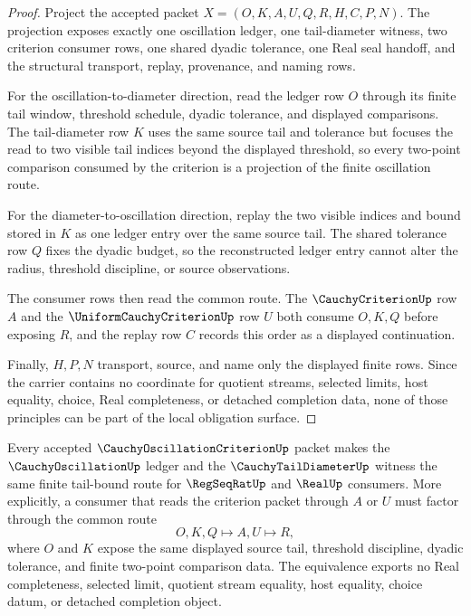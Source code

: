 \begin{proof}
Project the accepted packet $X=(O,K,A,U,Q,R,H,C,P,N)$. The projection exposes exactly one oscillation ledger, one tail-diameter witness, two criterion consumer rows, one shared dyadic tolerance, one Real seal handoff, and the structural transport, replay, provenance, and naming rows.

For the oscillation-to-diameter direction, read the ledger row $O$ through its finite tail window, threshold schedule, dyadic tolerance, and displayed comparisons. The tail-diameter row $K$ uses the same source tail and tolerance but focuses the read to two visible tail indices beyond the displayed threshold, so every two-point comparison consumed by the criterion is a projection of the finite oscillation route.

For the diameter-to-oscillation direction, replay the two visible indices and bound stored in $K$ as one ledger entry over the same source tail. The shared tolerance row $Q$ fixes the dyadic budget, so the reconstructed ledger entry cannot alter the radius, threshold discipline, or source observations.

The consumer rows then read the common route. The $\CauchyCriterionUp$ row $A$ and the $\UniformCauchyCriterionUp$ row $U$ both consume $O,K,Q$ before exposing $R$, and the replay row $C$ records this order as a displayed continuation.

Finally, $H,P,N$ transport, source, and name only the displayed finite rows. Since the carrier contains no coordinate for quotient streams, selected limits, host equality, choice, Real completeness, or detached completion data, none of those principles can be part of the local obligation surface.
\end{proof}

\begin{theorem}
\label{thm:cauchy-oscillation-criterion-tail-diameter-equivalence}
Every accepted $\CauchyOscillationCriterionUp$ packet makes the $\CauchyOscillationUp$ ledger and the $\CauchyTailDiameterUp$ witness the same finite tail-bound route for $\RegSeqRatUp$ and $\RealUp$ consumers. More explicitly, a consumer that reads the criterion packet through $A$ or $U$ must factor through the common route
$$
O,K,Q \longmapsto A,U \longmapsto R,
$$
where $O$ and $K$ expose the same displayed source tail, threshold discipline, dyadic tolerance, and finite two-point comparison data. The equivalence exports no Real completeness, selected limit, quotient stream equality, host equality, choice datum, or detached completion object.
\end{theorem}

